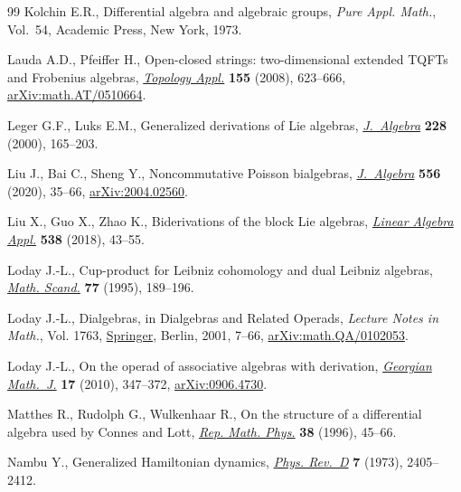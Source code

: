 \documentclass[pdftex]{sigma}
\numberwithin{equation}{section}
\begin{document}
\begin{thebibliography}{99}
Kolchin E.R., Differential algebra and algebraic groups, \textit{Pure Appl.
 Math.}, Vol.~54, Academic Press, New York, 1973.

Lauda A.D., Pfeiffer H., Open-closed strings: two-dimensional extended {TQFT}s
 and {F}robenius algebras, \href{https://doi.org/10.1016/j.topol.2007.11.005}{\textit{Topology Appl.}} \textbf{155} (2008),
 623--666, \href{https://arxiv.org/abs/math.AT/0510664}{arXiv:math.AT/0510664}.

Leger G.F., Luks E.M., Generalized derivations of {L}ie algebras,
 \href{https://doi.org/10.1006/jabr.1999.8250}{\textit{J.~Algebra}} \textbf{228} (2000), 165--203.

Liu J., Bai C., Sheng Y., Noncommutative {P}oisson bialgebras,
 \href{https://doi.org/10.1016/j.jalgebra.2020.03.009}{\textit{J.~Algebra}} \textbf{556} (2020), 35--66, \href{https://arxiv.org/abs/2004.02560}{arXiv:2004.02560}.

Liu X., Guo X., Zhao K., Biderivations of the block {L}ie algebras,
 \href{https://doi.org/10.1016/j.laa.2017.10.011}{\textit{Linear Algebra Appl.}} \textbf{538} (2018), 43--55.

Loday J.-L., Cup-product for {L}eibniz cohomology and dual {L}eibniz algebras,
 \href{https://doi.org/10.7146/math.scand.a-12560}{\textit{Math. Scand.}} \textbf{77} (1995), 189--196.

Loday J.-L., Dialgebras, in Dialgebras and Related Operads, \textit{Lecture
 Notes in Math.}, Vol. 1763, \href{https://doi.org/10.1007/3-540-45328-8_2}{Springer}, Berlin, 2001, 7--66,
 \href{https://arxiv.org/abs/math.QA/0102053}{arXiv:math.QA/0102053}.

Loday J.-L., On the operad of associative algebras with derivation,
 \href{https://doi.org/10.1515/gmj.2010.010}{\textit{Georgian Math.~J.}} \textbf{17} (2010), 347--372, \href{https://arxiv.org/abs/0906.4730}{arXiv:0906.4730}.

Matthes R., Rudolph G., Wulkenhaar R., On the structure of a differential
 algebra used by {C}onnes and {L}ott, \href{https://doi.org/10.1016/0034-4877(96)87677-4}{\textit{Rep. Math. Phys.}} \textbf{38}
 (1996), 45--66.

Nambu Y., Generalized {H}amiltonian dynamics, \href{https://doi.org/10.1103/PhysRevD.7.2405}{\textit{Phys. Rev.~D}} \textbf{7}
 (1973), 2405--2412.


\end{thebibliography}
\end{document}
